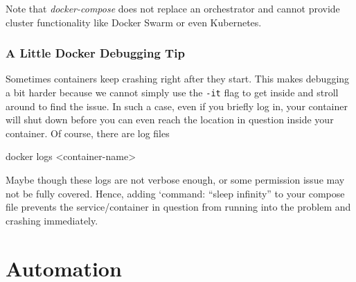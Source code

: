 \documentclass[
  12pt,
  letterpaper,
]{krantz}
\newenvironment{Shaded}{\begin{snugshade}}{\end{snugshade}}
\newcommand{\ExtensionTok}[1]{\textcolor[rgb]{0.00,0.23,0.31}{#1}}
\newcommand{\NormalTok}[1]{\textcolor[rgb]{0.00,0.23,0.31}{#1}}
\newcommand{\OperatorTok}[1]{\textcolor[rgb]{0.37,0.37,0.37}{#1}}
\begin{document}
\begin{tcolorbox}[enhanced jigsaw, colback=white, leftrule=.75mm, breakable, colframe=quarto-callout-note-color-frame, bottomrule=.15mm, arc=.35mm, opacityback=0, rightrule=.15mm, toprule=.15mm, left=2mm]
\begin{minipage}[t]{5.5mm}
\textcolor{quarto-callout-note-color}{\faInfo}
\end{minipage}%
\begin{minipage}[t]{\textwidth - 5.5mm}

Note that \emph{docker-compose} does not replace an orchestrator and
cannot provide cluster functionality like Docker Swarm or even
Kubernetes.

\end{minipage}%
\end{tcolorbox}

\hypertarget{a-little-docker-debugging-tip}{%
\subsection{A Little Docker Debugging
Tip}\label{a-little-docker-debugging-tip}}

Sometimes containers keep crashing right after they start.
This makes debugging a bit harder because we cannot simply use the
\texttt{-it} flag to get inside and stroll around to find the issue. In
such a case, even if you briefly log in, your container will shut down
before you can even reach the location in question inside your
container. Of course, there are log files

\begin{Shaded}
\begin{Highlighting}[]
\ExtensionTok{docker}\NormalTok{ logs }\OperatorTok{\textless{}}\NormalTok{container{-}name}\OperatorTok{\textgreater{}}
\end{Highlighting}
\end{Shaded}

Maybe though these logs are not verbose enough, or some permission issue
may not be fully covered. Hence, adding `command: ``sleep infinity'' to
your compose file prevents the service/container in question from
running into the problem and crashing immediately.


\hypertarget{sec-auto}{%
\chapter{Automation}\label{sec-auto}}
\end{document}
